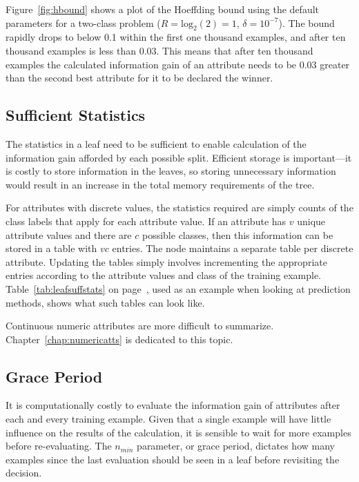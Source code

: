 Figure~\ref{fig:hbound} shows a plot of the Hoeffding bound using the default parameters for a two-class problem ($R = \mathrm{log}_{2}(2) = 1$, $\delta = 10^{-7}$). The bound rapidly drops to below 0.1 within the first one thousand examples, and after ten thousand examples is less than 0.03. This means that after ten thousand examples the calculated information gain of an attribute needs to be 0.03 greater than the second best attribute for it to be declared the winner.

\subsection{Sufficient Statistics}
\label{sec:suffstats}

The statistics in a leaf need to be sufficient to enable calculation of the information gain afforded by each possible split. Efficient storage is important---it is costly to store information in the leaves, so storing unnecessary information would result in an increase in the total memory requirements of the tree.

For attributes with discrete values, the statistics required are simply counts of the class labels that apply for each attribute value. If an attribute has $v$ unique attribute values and there are $c$ possible classes, then this information can be stored in a table with $vc$ entries. The node maintains a separate table per discrete attribute. Updating the tables simply involves incrementing the appropriate entries according to the attribute values and class of the training example.
Table~\ref{tab:leafsuffstats} on page~\pageref{tab:leafsuffstats}, used as an example when looking at prediction methods, shows what such tables can look like.

Continuous numeric attributes are more difficult to summarize. Chapter~\ref{chap:numericatts} is dedicated to this topic.

\subsection{Grace Period}
\label{sec:graceperiod}

It is computationally costly to evaluate the information gain of attributes after each and every training example. Given that a single example will have little influence on the results of the calculation, it is sensible to wait for more examples before re-evaluating. The $n_{min}$ parameter, or grace period, dictates how many examples since the last evaluation should be seen in a leaf before revisiting the decision.

